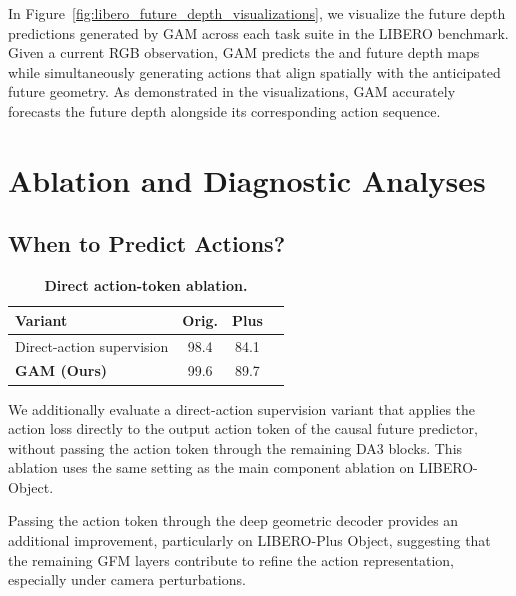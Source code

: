 \documentclass{llmxive}
\begin{document}
In Figure~\ref{fig:libero_future_depth_visualizations}, we visualize the future depth predictions generated by GAM across each task suite in the LIBERO benchmark. Given a current RGB observation, GAM predicts the and future depth maps while simultaneously generating actions that align spatially with the anticipated future geometry. As demonstrated in the visualizations, GAM accurately forecasts the future depth alongside its corresponding action sequence.



\section{Ablation and Diagnostic Analyses}
\label{sec:appendix-ablation_analysis}


\subsection{When to Predict Actions?}
\label{sec:appendix-layer_ablation}


\begin{table}[t]
\vspace{-10pt}
    \centering
    \footnotesize
    \setlength{\tabcolsep}{3.5pt}
    \begin{tabular}{lccc}
    \toprule
    Variant  & Orig. & Plus \\
    \midrule
    Direct-action supervision & 98.4 & 84.1 \\
    \textbf{GAM (Ours)}  & 99.6 & 89.7 \\
    \bottomrule
    \end{tabular}\vspace{-10pt}

\caption{\textbf{Direct action-token ablation.}}
\label{tab:action_decoding_path_ablation}
\end{table}

We additionally evaluate a direct-action supervision variant that applies the action loss directly to the output action token of the causal future predictor, without passing the action token through the remaining DA3 blocks. This ablation uses the same setting as the main component ablation on LIBERO-Object.
 
Passing the action token through the deep geometric decoder provides an additional improvement, particularly on LIBERO-Plus Object, suggesting that the remaining GFM layers contribute to refine the action representation, especially under camera perturbations.
\end{document}
